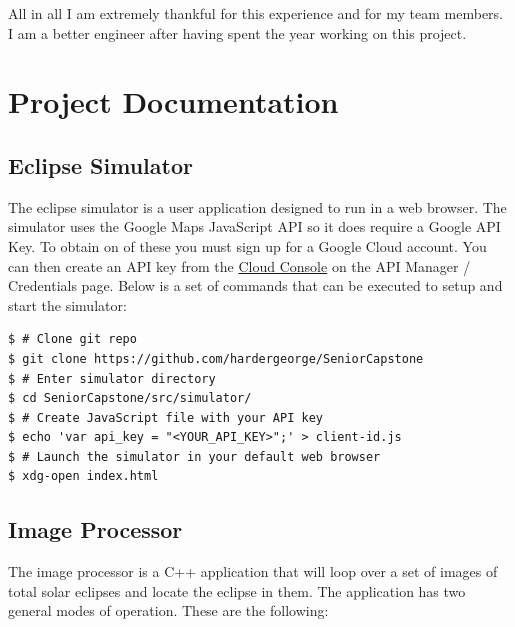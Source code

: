 \documentclass[10pt, onecolumn, draftclsnofoot, letterpaper, compsoc]{IEEEtran}
\begin{document}
    All in all I am extremely thankful for this experience and for my team members.
    I am a better engineer after having spent the year working on this project.



\section{Project Documentation}

\subsection{Eclipse Simulator}

The eclipse simulator is a user application designed to run in a web browser.
The simulator uses the Google Maps JavaScript API so it does require a
Google API Key. To obtain on of these you must sign up for a Google Cloud
account. You can then create an API key from the \href{https://console.cloud.google.com/}{Cloud Console} on the
API Manager / Credentials page. Below is a set of commands that can be executed to setup and start the simulator:

\begin{verbatim}
$ # Clone git repo
$ git clone https://github.com/hardergeorge/SeniorCapstone
$ # Enter simulator directory
$ cd SeniorCapstone/src/simulator/
$ # Create JavaScript file with your API key
$ echo 'var api_key = "<YOUR_API_KEY>";' > client-id.js
$ # Launch the simulator in your default web browser
$ xdg-open index.html
\end{verbatim}

\subsection{Image Processor}

The image processor is a C++ application that will loop over a set of images of total solar eclipses
and locate the eclipse in them. The application has two general modes of operation. These are the following:
\end{document}
